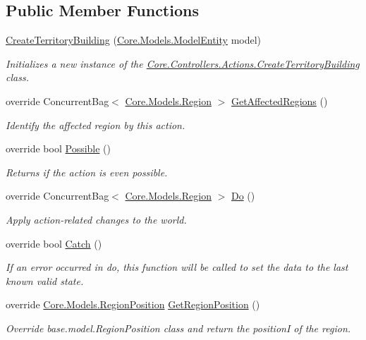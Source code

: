 \subsection*{Public Member Functions}
\begin{DoxyCompactItemize}
\item 
\hyperlink{classCore_1_1Controllers_1_1Actions_1_1CreateTerritoryBuilding_acc4cdbdc7791656da11abab9a6bd8688}{Create\+Territory\+Building} (\hyperlink{classCore_1_1Models_1_1ModelEntity}{Core.\+Models.\+Model\+Entity} model)
\begin{DoxyCompactList}\small\item\em Initializes a new instance of the \hyperlink{classCore_1_1Controllers_1_1Actions_1_1CreateTerritoryBuilding}{Core.\+Controllers.\+Actions.\+Create\+Territory\+Building} class. \end{DoxyCompactList}\item 
override Concurrent\+Bag$<$ \hyperlink{classCore_1_1Models_1_1Region}{Core.\+Models.\+Region} $>$ \hyperlink{classCore_1_1Controllers_1_1Actions_1_1CreateTerritoryBuilding_a7bb58b17239efcaa57968cee96b77bb8}{Get\+Affected\+Regions} ()
\begin{DoxyCompactList}\small\item\em Identify the affected region by this action. \end{DoxyCompactList}\item 
override bool \hyperlink{classCore_1_1Controllers_1_1Actions_1_1CreateTerritoryBuilding_a972f538b1c4a17240b6d7f9d7e0b2662}{Possible} ()
\begin{DoxyCompactList}\small\item\em Returns if the action is even possible. \end{DoxyCompactList}\item 
override Concurrent\+Bag$<$ \hyperlink{classCore_1_1Models_1_1Region}{Core.\+Models.\+Region} $>$ \hyperlink{classCore_1_1Controllers_1_1Actions_1_1CreateTerritoryBuilding_a3cda553c756ebbe5170a477576e73c03}{Do} ()
\begin{DoxyCompactList}\small\item\em Apply action-\/related changes to the world. \end{DoxyCompactList}\item 
override bool \hyperlink{classCore_1_1Controllers_1_1Actions_1_1CreateTerritoryBuilding_a07c2b5afe31a65bea350ff31e39508b4}{Catch} ()
\begin{DoxyCompactList}\small\item\em If an error occurred in do, this function will be called to set the data to the last known valid state. \end{DoxyCompactList}\item 
override \hyperlink{classCore_1_1Models_1_1RegionPosition}{Core.\+Models.\+Region\+Position} \hyperlink{classCore_1_1Controllers_1_1Actions_1_1CreateTerritoryBuilding_a293d75e2f559ce6c456601e030597b85}{Get\+Region\+Position} ()
\begin{DoxyCompactList}\small\item\em Override base.\+model.\+Region\+Position class and return the position\+I of the region. \end{DoxyCompactList}\end{DoxyCompactItemize}
